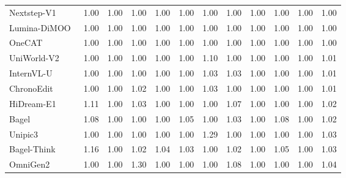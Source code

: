\documentclass{llmxive}
\begin{document}
\begin{table}[t]
{\begin{tabular}{l|cccccccccc|c}
            Nextstep-V1~\cite{han2025nextstep}
            & 1.00 & 1.00 & 1.00 & 1.00 & 1.00 & 1.00 & 1.00 & 1.00 & 1.00 & 1.00
            & \cellcolor[HTML]{C8C8C8}1.00 \\

            Lumina-DiMOO~\cite{xin2025lumina}
            & 1.00 & 1.00 & 1.00 & 1.00 & 1.00 & 1.00 & 1.00 & 1.00 & 1.00 & 1.00
            & \cellcolor[HTML]{C8C8C8}1.00 \\

            OneCAT~\cite{li2025onecat}
            & 1.00 & 1.00 & 1.00 & 1.00 & 1.00 & 1.00 & 1.00 & 1.00 & 1.00 & 1.00
            & \cellcolor[HTML]{C8C8C8}1.00 \\


            UniWorld-V2~\cite{li2025uniworld}
            & 1.00 & 1.00 & 1.00 & 1.00 & 1.00 & 1.10 & 1.00 & 1.00 & 1.00 & 1.00
            & \cellcolor[HTML]{C8C8C8}1.01 \\

            InternVL-U~\cite{tian2026internvl}
            & 1.00 & 1.00 & 1.00 & 1.00 & 1.00 & 1.03 & 1.03 & 1.00 & 1.00 & 1.00
            & \cellcolor[HTML]{C8C8C8}1.01 \\

            ChronoEdit~\cite{wu2025chronoedit}
            & 1.00 & 1.00 & 1.02 & 1.00 & 1.00 & 1.03 & 1.00 & 1.00 & 1.00 & 1.00
            & \cellcolor[HTML]{C8C8C8}1.01 \\
        
            HiDream-E1~\cite{cai2025hidream}
            & 1.11 & 1.00 & 1.03 & 1.00 & 1.00 & 1.00 & 1.07 & 1.00 & 1.00 & 1.00
            & \cellcolor[HTML]{C8C8C8}1.02 \\

            Bagel~\cite{deng2025emerging}
            & 1.08 & 1.00 & 1.00 & 1.00 & 1.05 & 1.00 & 1.03 & 1.00 & 1.08 & 1.00
            & \cellcolor[HTML]{C8C8C8}1.02 \\

            Unipic3~\cite{wei2026skywork}
            & 1.00 & 1.00 & 1.00 & 1.00 & 1.00 & 1.29 & 1.00 & 1.00 & 1.00 & 1.00
            & \cellcolor[HTML]{C8C8C8}1.03 \\

            Bagel-Think~\cite{deng2025emerging}
            & 1.16 & 1.00 & 1.02 & 1.04 & 1.03 & 1.00 & 1.02 & 1.00 & 1.05 & 1.00
            & \cellcolor[HTML]{C8C8C8}1.03 \\

            OmniGen2~\cite{wu2025omnigen2}
            & 1.00 & 1.00 & 1.30 & 1.00 & 1.00 & 1.00 & 1.08 & 1.00 & 1.00 & 1.00
            & \cellcolor[HTML]{C8C8C8}1.04 \\


\end{tabular}}
\end{table}
\end{document}
